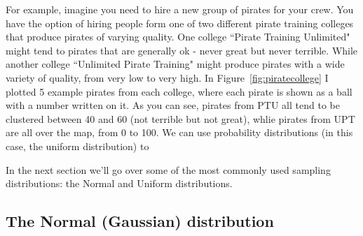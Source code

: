 \documentclass{tufte-book}\usepackage[]{graphicx}\usepackage[]{color}
\begin{document}
For example, imagine you need to hire a new group of pirates for your crew. You have the option of hiring people form one of two different pirate training colleges that produce pirates of varying quality. One college ``Pirate Training Unlimited" might tend to pirates that are generally ok - never great but never terrible. While another college ``Unlimited Pirate Training" might produce pirates with a wide variety of quality, from very low to very high. In Figure~\ref{fig:piratecollege} I plotted 5 example pirates from each college, where each pirate is shown as a ball with a number written on it. As you can see, pirates from PTU all tend to be clustered between 40 and 60 (not terrible but not great), whlie pirates from UPT are all over the map, from 0 to 100. We can use probability distributions (in this case, the uniform distribution) to 



In the next section we'll go over some of the most commonly used sampling distributions: the Normal and Uniform distributions.

\pagebreak
\subsection{The Normal (Gaussian) distribution}
\end{document}
